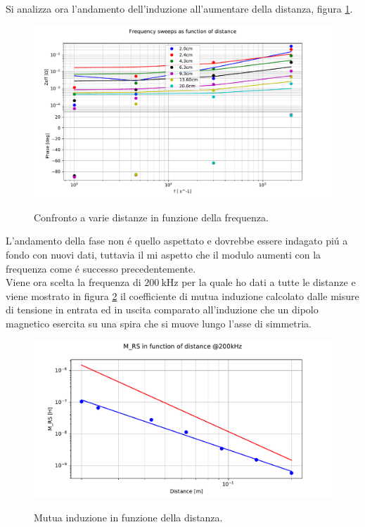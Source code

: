 Si analizza ora l'andamento dell'induzione all'aumentare della distanza, figura \ref{fig:brut}.
\begin{figure}[h]
	\centering
    \includegraphics[width=\textwidth]{Figure_16.pdf}
    \label{fig:brut}
    \caption{Confronto a varie distanze in funzione della frequenza.}
\end{figure}
L'andamento della fase non \'e quello aspettato e dovrebbe essere indagato pi\'u a fondo con nuovi dati, tuttavia il mi aspetto che il modulo aumenti con la frequenza come \'e successo precedentemente.\\
Viene ora scelta la frequenza di $200\ \si{\kilo\hertz}$ per la quale ho dati a tutte le distanze e viene mostrato in figura \ref{fig:r3} il coefficiente di mutua induzione calcolato dalle misure di tensione in entrata ed in uscita comparato all'induzione che un dipolo magnetico esercita su una spira che si muove lungo l'asse di simmetria.\\
\begin{figure}[h]
	\centering
    \includegraphics[width=\textwidth]{Figure_17.pdf}
    \label{fig:r3}
    \caption{Mutua induzione in funzione della distanza.}
\end{figure}
